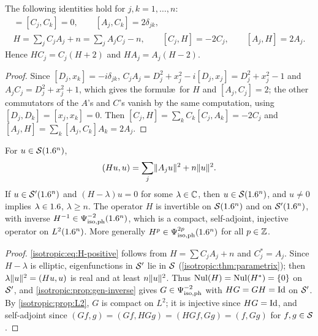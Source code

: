 \begin{lemma}\label{isotropic:lem:HO-identities}
The following identities hold for $j,k=1,\dots,n$:
\begin{gather*}
  [A_j,A_k]=[C_j,C_k]=0,\qquad[A_j,C_k]=2\delta_{jk},\\
  H=\sum_jC_jA_j+n=\sum_jA_jC_j-n,\qquad[C_j,H]=-2C_j,\qquad[A_j,H]=2A_j .
\end{gather*}
Hence $HC_j=C_j(H+2)$ and $HA_j=A_j(H-2)$.
\end{lemma}
\begin{proof}
Since $[D_j,x_k]=-i\delta_{jk}$,
$C_jA_j=D_j^2+x_j^2-i[D_j,x_j]=D_j^2+x_j^2-1$ and $A_jC_j=D_j^2+x_j^2+1$, which
gives the formul\ae\ for $H$ and $[A_j,C_j]=2$; the other commutators of the
$A$'s and $C$'s vanish by the same computation, using
$[D_j,D_k]=[x_j,x_k]=0$. Then
$[C_j,H]=\sum_kC_k[C_j,A_k]=-2C_j$ and $[A_j,H]=\sum_k[A_j,C_k]A_k=2A_j$.
\end{proof}

\begin{proposition}\label{isotropic:prop:H-inverse}
For $u\in\mathcal{S}(1.6^n)$,
\begin{equation}\label{isotropic:eq:H-positive}
  (Hu,u)=\sum_j\lVert A_ju\rVert^2+n\lVert u\rVert^2 .
\end{equation}
If $u\in\mathcal{S}'(1.6^n)$ and $(H-\lambda)u=0$ for some $\lambda\in\mathbb{C}$, then
$u\in\mathcal{S}(1.6^n)$, and $u\ne0$ implies $\lambda\in1.6$, $\lambda\ge n$. The
operator $H$ is invertible on $\mathcal{S}(1.6^n)$ and on $\mathcal{S}'(1.6^n)$, with inverse
$H^{-1}\in\Psi^{-2}_{\mathrm{iso,ph}}(1.6^n)$, which is a compact, self-adjoint, injective
operator on $L^2(1.6^n)$. More generally $H^p\in\Psi^{2p}_{\mathrm{iso,ph}}(1.6^n)$ for all
$p\in\mathbb{Z}$.
\end{proposition}
\begin{proof}
\eqref{isotropic:eq:H-positive} follows from $H=\sum C_jA_j+n$ and $C_j^*=A_j$.
Since $H-\lambda$ is elliptic, eigenfunctions in $\mathcal{S}'$ lie in $\mathcal{S}$
(\cref{isotropic:thm:parametrix}); then $\lambda\lVert u\rVert^2=(Hu,u)$ is real and
at least $n\lVert u\rVert^2$. Thus $\operatorname{Nul}(H)=\operatorname{Nul}(H^*)=\{0\}$ on $\mathcal{S}'$, and
\cref{isotropic:prop:gen-inverse} gives $G\in\Psi^{-2}_{\mathrm{iso,ph}}$ with $HG=GH=\operatorname{Id}$ on
$\mathcal{S}'$. By \cref{isotropic:prop:L2}, $G$ is compact on $L^2$; it is injective
since $HG=\operatorname{Id}$, and self-adjoint since $(Gf,g)=(Gf,HGg)=(HGf,Gg)=(f,Gg)$ for
$f,g\in\mathcal{S}$.
\end{proof}

